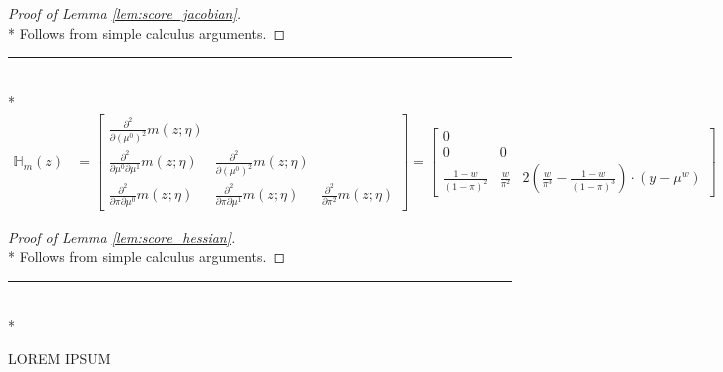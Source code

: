 \begin{proof}[Proof of Lemma \ref{lem:score_jacobian}]\mbox{}\\*
    Follows from simple calculus arguments.
\end{proof}

\hrule

\begin{lem}\label{lem:score_hessian}\mbox{}\\*
    \begin{equation}
        \begin{aligned}
            \mathbb{H}_{m}(z)
            & = \begin{bmatrix}
                \frac{\partial^2}{\partial \left(\mu^{0}\right)^2} m\left(z; \eta\right)   & & \\
                \frac{\partial^2}{\partial \mu^{0} \partial \mu^{1}} m\left(z; \eta\right) & \frac{\partial^2}{\partial \left(\mu^{0}\right)^2} m\left(z; \eta\right) & \\
                \frac{\partial^2}{\partial \pi \partial \mu^{0}} m\left(z; \eta\right)     & \frac{\partial^2}{\partial \pi \partial \mu^{1}} m\left(z; \eta\right) & \frac{\partial^2}{\partial \pi^2} m\left(z; \eta\right)
            \end{bmatrix} 
            = \begin{bmatrix}
                0  & & \\
                0 & 0 & \\
                \frac{1-w}{\left(1-\pi\right)^{2}} & \frac{w}{\pi^2} & 2\left(\frac{w}{\pi^3} - \frac{1-w}{\left(1-\pi\right)^{3}}\right)  \cdot \left(y - \mu^{w}\right)
            \end{bmatrix}
        \end{aligned}
    \end{equation}
\end{lem}

\begin{proof}[Proof of Lemma \ref{lem:score_hessian}]\mbox{}\\*
    Follows from simple calculus arguments.
\end{proof}


\hrule

\begin{lem}\label{lem:score_gateaux_derivative}\mbox{}\\*
    
    {\color{red} LOREM IPSUM}
\end{lem}

